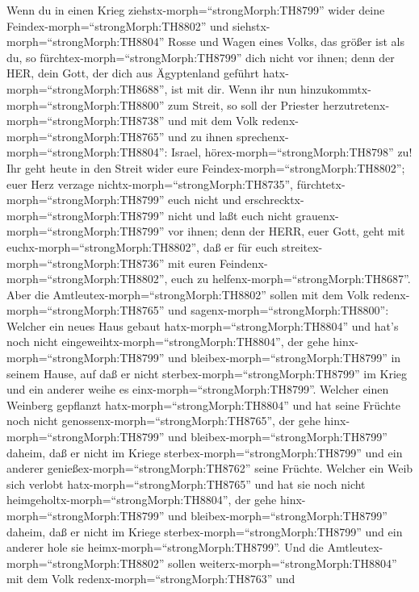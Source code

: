  Wenn du in einen Krieg ziehstx-morph=``strongMorph:TH8799''
wider deine Feindex-morph=``strongMorph:TH8802'' und
siehstx-morph=``strongMorph:TH8804'' Rosse und Wagen eines Volks, das
größer ist als du, so fürchtex-morph=``strongMorph:TH8799'' dich nicht
vor ihnen; denn der HER, dein Gott, der dich aus Ägyptenland geführt
hatx-morph=``strongMorph:TH8688'', ist mit dir.  Wenn ihr
nun hinzukommtx-morph=``strongMorph:TH8800'' zum Streit, so soll der
Priester herzutretenx-morph=``strongMorph:TH8738'' und mit dem Volk
redenx-morph=``strongMorph:TH8765''  und zu ihnen
sprechenx-morph=``strongMorph:TH8804'': Israel,
hörex-morph=``strongMorph:TH8798'' zu! Ihr geht heute in den Streit
wider eure Feindex-morph=``strongMorph:TH8802''; euer Herz verzage
nichtx-morph=``strongMorph:TH8735'',
fürchtetx-morph=``strongMorph:TH8799'' euch nicht und
erschrecktx-morph=``strongMorph:TH8799'' nicht und laßt euch nicht
grauenx-morph=``strongMorph:TH8799'' vor ihnen;  denn der
HERR, euer Gott, geht mit euchx-morph=``strongMorph:TH8802'', daß er für
euch streitex-morph=``strongMorph:TH8736'' mit euren
Feindenx-morph=``strongMorph:TH8802'', euch zu
helfenx-morph=``strongMorph:TH8687''.  Aber die
Amtleutex-morph=``strongMorph:TH8802'' sollen mit dem Volk
redenx-morph=``strongMorph:TH8765'' und
sagenx-morph=``strongMorph:TH8800'': Welcher ein neues Haus gebaut
hatx-morph=``strongMorph:TH8804'' und hat's noch nicht
eingeweihtx-morph=``strongMorph:TH8804'', der gehe
hinx-morph=``strongMorph:TH8799'' und
bleibex-morph=``strongMorph:TH8799'' in seinem Hause, auf daß er nicht
sterbex-morph=``strongMorph:TH8799'' im Krieg und ein anderer weihe es
einx-morph=``strongMorph:TH8799''.  Welcher einen Weinberg
gepflanzt hatx-morph=``strongMorph:TH8804'' und hat seine Früchte noch
nicht genossenx-morph=``strongMorph:TH8765'', der gehe
hinx-morph=``strongMorph:TH8799'' und
bleibex-morph=``strongMorph:TH8799'' daheim, daß er nicht im Kriege
sterbex-morph=``strongMorph:TH8799'' und ein anderer
genießex-morph=``strongMorph:TH8762'' seine Früchte. 
Welcher ein Weib sich verlobt hatx-morph=``strongMorph:TH8765'' und hat
sie noch nicht heimgeholtx-morph=``strongMorph:TH8804'', der gehe
hinx-morph=``strongMorph:TH8799'' und
bleibex-morph=``strongMorph:TH8799'' daheim, daß er nicht im Kriege
sterbex-morph=``strongMorph:TH8799'' und ein anderer hole sie
heimx-morph=``strongMorph:TH8799''.  Und die
Amtleutex-morph=``strongMorph:TH8802'' sollen
weiterx-morph=``strongMorph:TH8804'' mit dem Volk
redenx-morph=``strongMorph:TH8763'' und
